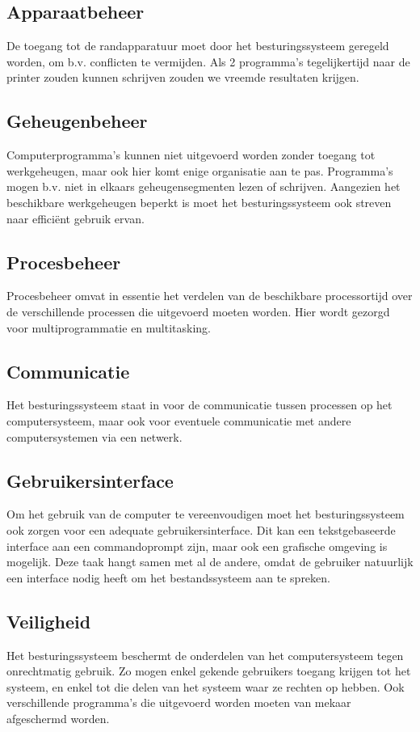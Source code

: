 \subsection{Apparaatbeheer}

De toegang tot de randapparatuur moet door het besturingssysteem
geregeld worden, om b.v. conflicten te vermijden. Als 2 programma's
tegelijkertijd naar de printer zouden kunnen schrijven zouden we
vreemde resultaten krijgen.

\subsection{Geheugenbeheer}

Computerprogramma's kunnen niet uitgevoerd worden zonder toegang
tot werkgeheugen, maar ook hier komt enige organisatie aan te pas.
Programma's mogen b.v. niet in elkaars geheugensegmenten lezen of
schrijven. Aangezien het beschikbare werkgeheugen beperkt is moet het
besturingssysteem ook streven naar effici\"ent gebruik ervan.

\subsection{Procesbeheer}

Procesbeheer omvat in essentie het verdelen van de beschikbare
processortijd over de verschillende processen die uitgevoerd moeten
worden. Hier wordt gezorgd voor multiprogrammatie en
multitasking.

\subsection{Communicatie}

Het besturingssysteem staat in voor de communicatie tussen
processen op het computersysteem, maar ook voor eventuele communicatie
met andere computersystemen via een netwerk.

\subsection{Gebruikersinterface}

Om het gebruik van de computer te vereenvoudigen moet het
besturingssysteem ook zorgen voor een adequate gebruikersinterface.
Dit kan een tekstgebaseerde interface aan een commandoprompt zijn,
maar ook een grafische omgeving is mogelijk. Deze taak hangt samen met
al de andere, omdat de gebruiker natuurlijk een interface nodig heeft
om het bestandssysteem aan te spreken.

\subsection{Veiligheid}

Het besturingssysteem beschermt de onderdelen van het computersysteem tegen
onrechtmatig gebruik. Zo mogen enkel gekende gebruikers toegang krijgen tot
het systeem, en enkel tot die delen van het systeem waar ze rechten op hebben.
Ook verschillende programma's die uitgevoerd worden moeten van mekaar
afgeschermd worden.
